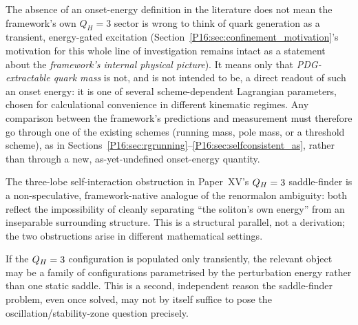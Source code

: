 \begin{remark}
\label{P16:rem:onset_energy_scope}
The absence of an onset-energy definition in the literature does not
mean the framework's own $Q_H=3$ sector is wrong to think of quark
generation as a transient, energy-gated excitation
(Section~\ref{P16:sec:confinement_motivation}'s motivation for this whole
line of investigation remains intact as a statement about the
\emph{framework's internal physical picture}). It means only that
\emph{PDG-extractable quark mass} is not, and is not intended to be,
a direct readout of such an onset energy: it is one of several
scheme-dependent Lagrangian parameters, chosen for calculational
convenience in different kinematic regimes. Any comparison between the
framework's predictions and measurement must therefore go through one
of the existing schemes (running mass, pole mass, or a threshold
scheme), as in Sections~\ref{P16:sec:rgrunning}--\ref{P16:sec:selfconsistent_as},
rather than through a new, as-yet-undefined onset-energy quantity.
\end{remark}

\begin{remark}
\label{P16:rem:saddle_renormalon_parallel}
The three-lobe self-interaction obstruction in Paper~XV's $Q_H=3$
saddle-finder is a non-speculative, framework-native analogue of the
renormalon ambiguity: both reflect the impossibility of cleanly separating
``the soliton's own energy'' from an inseparable surrounding structure.
This is a structural parallel, not a derivation; the two obstructions
arise in different mathematical settings.
\end{remark}

\begin{remark}
\label{P16:rem:transient_complication}
If the $Q_H=3$ configuration is populated only transiently, the relevant
object may be a family of configurations parametrised by the perturbation
energy rather than one static saddle. This is a second, independent reason
the saddle-finder problem, even once solved, may not by itself suffice to
pose the oscillation/stability-zone question precisely.
\end{remark}

